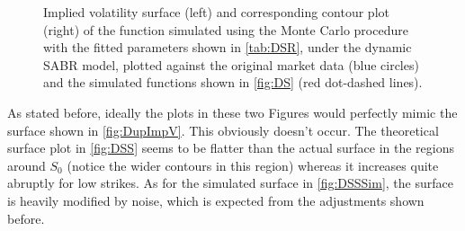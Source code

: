 \begin{figure}[H]
  \begin{subfigmatrix}{2}
  \end{subfigmatrix}
    \caption[Implied volatility surface and corresponding contour plot of the function simulated using the Monte Carlo procedure with the fitted parameters shown in \autoref{tab:DSR}, under the dynamic SABR model, plotted against the original market data and the simulated functions shown in \autoref{fig:DS}.]{Implied volatility surface (left) and corresponding contour plot (right) of the function simulated using the Monte Carlo procedure with the fitted parameters shown in \autoref{tab:DSR}, under the dynamic SABR model, plotted against the original market data (blue circles) and the simulated functions shown in \autoref{fig:DS} (red dot-dashed lines).}\label{fig:DSSSim}
\end{figure} 


As stated before, ideally the plots in these two Figures would perfectly mimic the surface shown in \autoref{fig:DupImpV}. This obviously doesn't occur. The theoretical surface plot in \autoref{fig:DSS} seems to be flatter than the actual surface in the regions around $S_0$ (notice the wider contours in this region) whereas it increases quite abruptly for low strikes.
As for the simulated surface in \autoref{fig:DSSSim}, the surface is heavily modified by noise, which is expected from the adjustments shown before.

